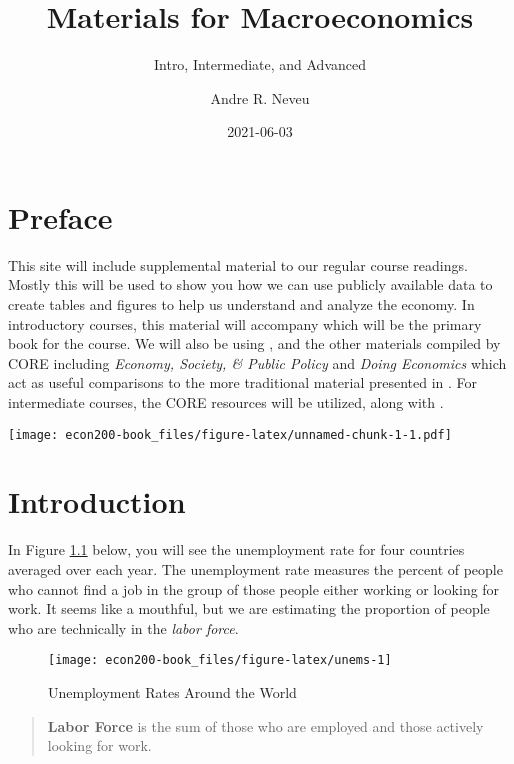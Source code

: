\documentclass[
]{book}
\title{Materials for Macroeconomics}
\subtitle{Intro, Intermediate, and Advanced}
\author{Andre R. Neveu}
\date{2021-06-03}
\begin{document}
\maketitle

{
\setcounter{tocdepth}{1}
\tableofcontents
}
\hypertarget{preface}{%
\chapter*{Preface}\label{preface}}

This site will include supplemental material to our regular course readings. Mostly this will be used to show you how we can use publicly available data to create tables and figures to help us understand and analyze the economy. In introductory courses, this material will accompany \citet{tw} which will be the primary book for the course. We will also be using \citet{core}, and the other materials compiled by CORE including \emph{Economy, Society, \& Public Policy} \citep{espp} and \emph{Doing Economics} \citep{doing} which act as useful comparisons to the more traditional material presented in \citet{tw}. For intermediate courses, the CORE resources will be utilized, along with \citet{jones}.

\texttt{[image: econ200-book\_files/figure-latex/unnamed-chunk-1-1.pdf]}

\hypertarget{intro}{%
\chapter{Introduction}\label{intro}}

In Figure \ref{fig:unems} below, you will see the unemployment rate for four countries averaged over each year. The unemployment rate measures the percent of people who cannot find a job in the group of those people either working or looking for work. It seems like a mouthful, but we are estimating the proportion of people who are technically in the \emph{labor force}.

\begin{figure}

{\centering \texttt{[image: econ200-book\_files/figure-latex/unems-1]} 

}

\caption{Unemployment Rates Around the World}\label{fig:unems}
\end{figure}

\begin{quote}
\textbf{Labor Force} is the sum of those who are employed and those actively looking for work.
\end{quote}
\end{document}
